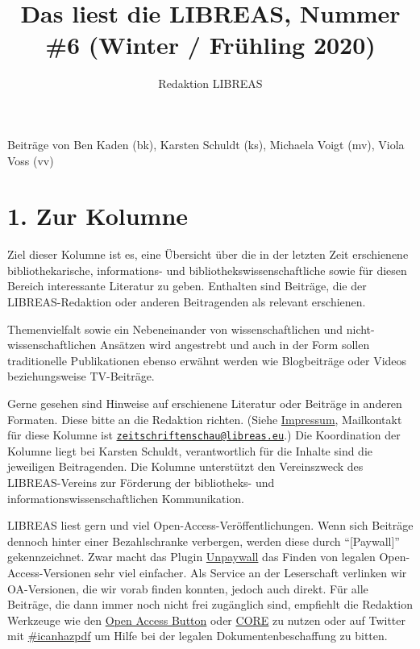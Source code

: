 \documentclass[a4paper,
fontsize=11pt,
oneside,
numbers=noperiodatend,
parskip=half-,
bibliography=totoc,
final
]{scrartcl}
\title{\LARGE{Das liest die LIBREAS, Nummer \#6 (Winter / Frühling 2020)}}%
\author{Redaktion LIBREAS} %
\date{}
\begin{document}
\maketitle
\thispagestyle{fancyplain} 


Beiträge von Ben Kaden (bk), Karsten Schuldt (ks), Michaela Voigt (mv),
Viola Voss (vv)

\hypertarget{zur-kolumne}{%
\section{1. Zur Kolumne}\label{zur-kolumne}}

Ziel dieser Kolumne ist es, eine Übersicht über die in der letzten Zeit
erschienene bibliothekarische, informations- und
bibliothekswissenschaftliche sowie für diesen Bereich interessante
Literatur zu geben. Enthalten sind Beiträge, die der LIBREAS-Redaktion
oder anderen Beitragenden als relevant erschienen.

Themenvielfalt sowie ein Nebeneinander von wissenschaftlichen und
nicht-wissenschaftlichen Ansätzen wird angestrebt und auch in der Form
sollen traditionelle Publikationen ebenso erwähnt werden wie
Blogbeiträge oder Videos beziehungsweise TV-Beiträge.

Gerne gesehen sind Hinweise auf erschienene Literatur oder Beiträge in
anderen Formaten. Diese bitte an die Redaktion richten. (Siehe
\href{http://libreas.eu/about/}{Impressum}, Mailkontakt für diese
Kolumne ist
\href{mailto:zeitschriftenschau@libreas.eu}{\nolinkurl{zeitschriftenschau@libreas.eu}}.)
Die Koordination der Kolumne liegt bei Karsten Schuldt, verantwortlich
für die Inhalte sind die jeweiligen Beitragenden. Die Kolumne
unterstützt den Vereinszweck des LIBREAS-Vereins zur Förderung der
bibliotheks- und informationswissenschaftlichen Kommunikation.

LIBREAS liest gern und viel Open-Access-Veröffentlichungen. Wenn sich
Beiträge dennoch hinter einer Bezahlschranke verbergen, werden diese
durch ``{[}Paywall{]}'' gekennzeichnet. Zwar macht das Plugin
\href{http://unpaywall.org/}{Unpaywall} das Finden von legalen
Open-Access-Versionen sehr viel einfacher. Als Service an der
Leserschaft verlinken wir OA-Versionen, die wir vorab finden konnten,
jedoch auch direkt. Für alle Beiträge, die dann immer noch nicht frei
zugänglich sind, empfiehlt die Redaktion Werkzeuge wie den
\href{https://openaccessbutton.org/}{Open Access Button} oder
\href{https://core.ac.uk/services/discovery/}{CORE} zu nutzen oder auf
Twitter mit
\href{https://twitter.com/hashtag/icanhazpdf?src=hash}{\#icanhazpdf} um
Hilfe bei der legalen Dokumentenbeschaffung zu bitten.
\end{document}
